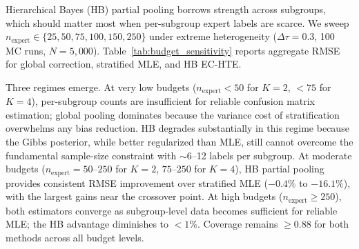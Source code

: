 Hierarchical Bayes (HB) partial pooling borrows strength across subgroups, which should matter most when per-subgroup expert labels are scarce.
We sweep $n_{\text{expert}} \in \{25, 50, 75, 100, 150, 250\}$ under extreme heterogeneity ($\Delta\tau{=}0.3$, 100 MC runs, $N{=}5{,}000$).
Table~\ref{tab:budget_sensitivity} reports aggregate RMSE for global correction, stratified MLE, and HB EC-HTE.

\begin{table}[h]
\centering
\caption{RMSE across expert budgets under extreme heterogeneity.
HB crossover (first budget where HB $<$ MLE) occurs at approximately 10 expert labels per subgroup-cell:
$n_{\text{expert}}{=}50$ for $K{=}2$ and $n_{\text{expert}}{=}75$ for $K{=}4$.}
\label{tab:budget_sensitivity}
\small
{}
\end{table}

Three regimes emerge.
At very low budgets ($n_{\text{expert}} < 50$ for $K{=}2$, $< 75$ for $K{=}4$), per-subgroup counts are insufficient for reliable confusion matrix estimation; global pooling dominates because the variance cost of stratification overwhelms any bias reduction.
HB degrades substantially in this regime because the Gibbs posterior, while better regularized than MLE, still cannot overcome the fundamental sample-size constraint with $\sim$6--12 labels per subgroup.
At moderate budgets ($n_{\text{expert}} = 50$--$250$ for $K{=}2$, $75$--$250$ for $K{=}4$), HB partial pooling provides consistent RMSE improvement over stratified MLE ($-0.4\%$ to $-16.1\%$), with the largest gains near the crossover point.
At high budgets ($n_{\text{expert}} \geq 250$), both estimators converge as subgroup-level data becomes sufficient for reliable MLE; the HB advantage diminishes to $< 1\%$.
Coverage remains $\geq 0.88$ for both methods across all budget levels.

